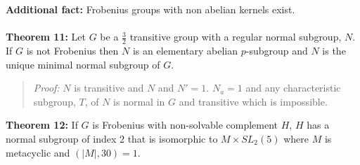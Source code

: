 {\bf Additional fact:} Frobenius groups with non abelian kernels exist.
\\
\\
{\bf Theorem 11:} 
Let $G$ be a ${\frac 3 2}$ transitive group with a regular normal subgroup, $N$.  If $G$ is not Frobenius then $N$ is an
elementary abelian $p$-subgroup and $N$ is the unique minimal normal subgroup of $G$.
\begin{quote}
\emph{Proof:} $N$ is transitive and $N$ and $N'= 1$.  $N_a= 1$ and any characteristic subgroup, $T$, of $N$ is normal in $G$ and transitive
which is impossible.
\end{quote}
{\bf Theorem 12:} 
If $G$ is Frobenius with non-solvable complement $H$, $H$ has a normal subgroup of index $2$ that is isomorphic to
$M \times SL_2(5)$ where $M$ is metacyclic and $(|M|, 30) = 1$.
\begin{quote}
\end{quote}
